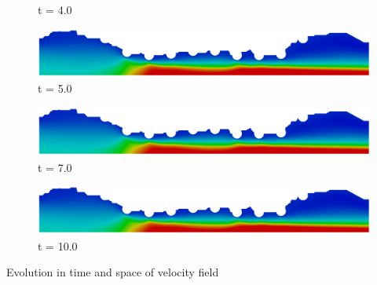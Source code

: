 \begin{frame}
\begin{figure}
\begin{minipage}{.50\linewidth}
      \scriptsize t = 4.0
     \end{minipage}%
     \begin{minipage}{.50\linewidth}
      \centering
      \includegraphics[scale=0.08]{images/vel_RealStrut10000.png}\\
      \scriptsize t = 5.0
 \end{minipage}
     \begin{minipage}{.50\linewidth}
     \medskip
      \centering
      \includegraphics[scale=0.08]{images/vel_RealStrut14000.png}\\
      \scriptsize t = 7.0
     \end{minipage}%
     \begin{minipage}{.50\linewidth}
     \medskip
      \centering
      \includegraphics[scale=0.08]{images/vel_RealStrut20000.png}\\
      \scriptsize t = 10.0
     \end{minipage}
\end{figure}
\vspace{0cm}
\centering \scriptsize Evolution in time and space of velocity field
\end{frame}
\fi


